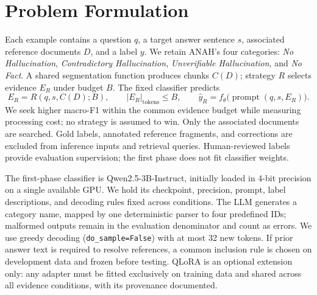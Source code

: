 \section{Problem Formulation}
\label{section:formulation}
Each example contains a question $q$, a target answer sentence $s$, associated reference documents $D$, and a label $y$. We retain ANAH's four categories: \emph{No Hallucination}, \emph{Contradictory Hallucination}, \emph{Unverifiable Hallucination}, and \emph{No Fact}. A shared segmentation function produces chunks $C(D)$; strategy $R$ selects evidence $E_R$ under budget $B$. The fixed classifier predicts
\begin{equation}
E_R=R(q,s,C(D);B),\qquad |E_R|_{\mathrm{tokens}}\leq B,
\qquad \hat y_R=f_\theta\bigl(\operatorname{prompt}(q,s,E_R)\bigr).
\end{equation}
We seek higher macro-F1 within the common evidence budget while measuring processing cost; no strategy is assumed to win. Only the associated documents are searched. Gold labels, annotated reference fragments, and corrections are excluded from inference inputs and retrieval queries. Human-reviewed labels provide evaluation supervision; the first phase does not fit classifier weights.

The first-phase classifier is Qwen2.5-3B-Instruct, initially loaded in 4-bit precision on a single available GPU. We hold its checkpoint, precision, prompt, label descriptions, and decoding rules fixed across conditions. The LLM generates a category name, mapped by one deterministic parser to four predefined IDs; malformed outputs remain in the evaluation denominator and count as errors. We use greedy decoding (\texttt{do\_sample=False}) with at most 32 new tokens. If prior answer text is required to resolve references, a common inclusion rule is chosen on development data and frozen before testing. QLoRA is an optional extension only: any adapter must be fitted exclusively on training data and shared across all evidence conditions, with its provenance documented.

